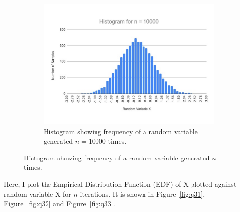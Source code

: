 \documentclass[titlepage, 11pt]{article}
\begin{document}
\begin{figure}[ht]
\begin{subfigure}{.5\textwidth}
\end{subfigure}
\begin{subfigure}{.5\textwidth}
  \centering
  \begin{center}
  \includegraphics[width=\linewidth]{HIS10000.pdf}
  \end{center}
  \caption{Histogram showing frequency of a random variable generated $n=10000$ times. }
  \label{fig:q23}
\end{subfigure}
\caption{Histogram showing frequency of a random variable generated $n$ times.}
\label{fig:q2}
\end{figure}

Here, I plot the Empirical Distribution Function (EDF) of X plotted against random variable X for $n$ iterations. It is shown in Figure~\ref{fig:q31}, Figure~\ref{fig:q32} and Figure~\ref{fig:q33}.\\
\end{document}
